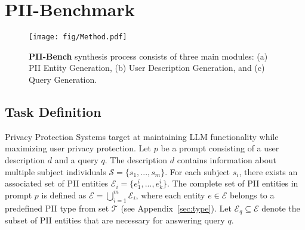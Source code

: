 \section{PII-Benchmark}
\begin{figure*}[t]
\texttt{[image: fig/Method.pdf]}
\caption{
\textbf{PII-Bench} synthesis process consists of three main modules: (a) PII Entity Generation, (b) User Description Generation, and (c) Query Generation.
}
\label{fig:method}
\vspace{-5mm}
\end{figure*}


\begin{table}[t]
\centering
{}
\caption{Notation used throughout in Task Definition.}
\label{tab:notation}
\vspace{-5mm}
\end{table}

\subsection{Task Definition}

Privacy Protection Systems target at maintaining LLM functionality while maximizing user privacy protection.
Let $p$ be a prompt consisting of a user description $d$ and a query $q$. The description $d$ contains information about multiple subject individuals $\mathcal{S} = \{s_1, ..., s_m\}$.
For each subject $s_i$, there exists an associated set of PII entities $\mathcal{E}_i = \{e^{i}_{1}, ..., e^{i}_{k}\}$. 
The complete set of PII entities in prompt $p$ is defined as $\mathcal{E} = \bigcup_{i=1}^m \mathcal{E}_i$, where each entity $e \in \mathcal{E}$ belongs to a predefined PII type from set $\mathcal{T}$ (see Appendix~\ref{sec:type}).
Let $\mathcal{E}_q \subseteq \mathcal{E}$ denote the subset of PII entities that are necessary for answering query $q$.

